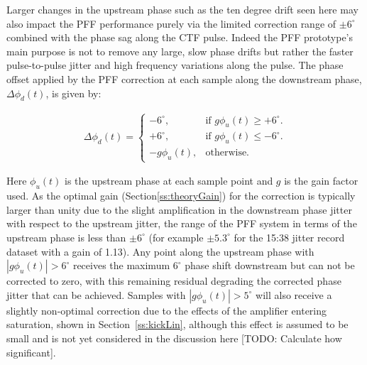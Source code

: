 Larger changes in the upstream phase such as the ten degree drift seen here may also impact the PFF performance purely via the limited correction range of \(\pm6^\circ\) combined with the phase sag along the CTF pulse. Indeed the PFF prototype's main purpose is not to remove any large, slow phase drifts but rather the faster pulse-to-pulse jitter and high frequency variations along the pulse. The phase offset applied by the PFF correction at each sample along the downstream phase, \(\Delta\phi_d(t)\), is given by:

\begin{eqnarray}
	\Delta\phi_d(t) = \begin{cases}
	-6^\circ, &  \text{if $g\phi_u(t) \geq+6^\circ$.}\\
	+6^\circ, &  \text{if $g\phi_u(t)\leq-6^\circ$}.\\
	-g\phi_u(t), &  \text{otherwise.}
	\end{cases}
	\label{e:limCorrection}
\end{eqnarray}

Here \(\phi_u(t)\) is the upstream phase at each sample point and \(g\) is the gain factor used. As the optimal gain (Section\ref{ss:theoryGain}) for the correction is typically larger than unity due to the slight amplification in the downstream phase jitter with respect to the upstream jitter, the range of the PFF system in terms of the upstream phase is less than \(\pm6^\circ\) (for example \(\pm5.3^\circ\) for the 15:38 jitter record dataset with a gain of 1.13). Any point along the upstream phase with \(|g\phi_u(t)| > 6^\circ\) receives the maximum \(6^\circ\) phase shift downstream but can not be corrected to zero, with this remaining residual degrading the corrected phase jitter that can be achieved. Samples with  \(|g\phi_u(t)| > 5^\circ\) will also receive a slightly non-optimal correction due to the effects of the amplifier entering saturation, shown in Section~\ref{ss:kickLin}, although this effect is assumed to be small and is not yet considered in the discussion here [TODO: Calculate how significant].

